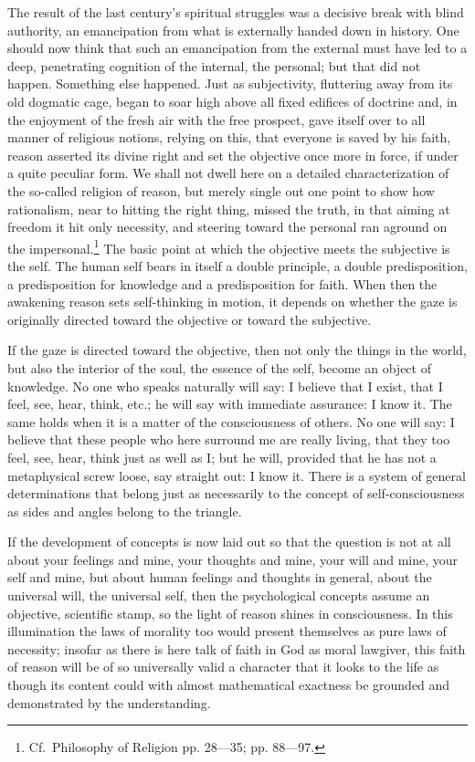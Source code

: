 \documentclass[12pt,a4paper,openany]{book}
\newcommand{\opage}[1]{\marginnote{\footnotesize\textit{[#1]}}}
\begin{document}
The result of the last century's spiritual
struggles was a decisive break with blind authority,
an emancipation from what is externally handed down in history.
One should now think that such an emancipation
from the external must have led to a deep, penetrating
cognition of the internal, the personal;
but that did not happen. Something else happened. Just
as subjectivity, fluttering away from its old dogmatic cage,
began to soar high above all fixed
edifices of doctrine and, in the enjoyment of the fresh air with
the free prospect, gave itself over to all manner of religious notions,
relying on this, that everyone is saved by his faith,
reason asserted its divine right and
set the objective once more in force, if under a
quite peculiar form. We shall not dwell here on
a detailed characterization of the so-called religion of reason,
but merely single out one point to show
how rationalism, near to hitting the right thing,
missed the truth, in that aiming at freedom
\setcounter{footnote}{0}%
\opage{613}it hit only necessity, and steering toward the personal
ran aground on the impersonal.\footnote[1]{Cf.\ Philosophy of Religion pp. 28—35; pp. 88---97.} The basic point at which the objective meets
the subjective is the self. The human self bears in
itself a double principle, a double predisposition, a predisposition for
knowledge and a predisposition for faith. When then the awakening
reason sets self-thinking in motion, it
depends on whether the gaze is originally directed toward
the objective or toward the subjective.

If the gaze is directed toward the objective, then not
only the things in the world, but also the interior of the soul, the
essence of the self, become an object of knowledge. No one who speaks
naturally will say: I believe that I exist, that I feel,
see, hear, think, etc.; he will say with immediate
assurance: I know it. The same holds
when it is a matter of the consciousness of others. No one will say:
I believe that these people who here surround me
are really living, that they too feel, see, hear, think
just as well as I; but he will, provided that he
has not a metaphysical screw loose, say straight out: I
know it. There is a system of general determinations
that belong just as necessarily to the concept of self-consciousness
as sides and angles belong to the triangle.

If the development of concepts is now laid out so that the question
is not at all about your feelings and mine, your
thoughts and mine, your will and mine, your self and mine, but
about human feelings and thoughts in general, about
the universal will, the universal self, then the psychological
concepts assume an objective, scientific stamp,
\setcounter{footnote}{0}%
\opage{614}so the light of reason shines in consciousness. In this
illumination the laws of morality too would present themselves
as pure laws of necessity; insofar as there is here talk
of faith in God as moral lawgiver, this faith of reason will
be of so universally valid a character that
it looks to the life as though its content could with almost
mathematical exactness be grounded and demonstrated by the
understanding.
\end{document}

